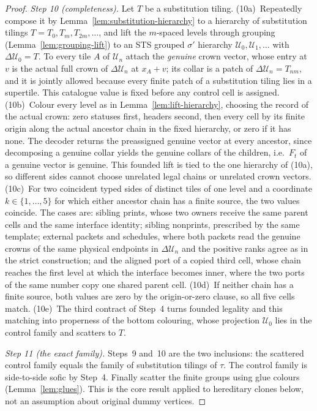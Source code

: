 \documentclass[11pt,a4paper]{article}
\theoremstyle{remark}
\begin{document}
\begin{proof}
\emph{Step 10 (completeness).}  Let $T$ be a substitution tiling.
(10a)~Repeatedly compose it by Lemma~\ref{lem:substitution-hierarchy} to a
hierarchy of substitution tilings $T=T_0,T_m,T_{2m},\ldots$, and lift the
$m$-spaced levels through grouping (Lemma~\ref{lem:grouping-lift}) to an
STS grouped $\sigma'$ hierarchy $\mathcal U_0,\mathcal U_1,\ldots$ with
$\Delta\mathcal U_0=T$.  To every tile $A$ of $\mathcal U_n$ attach the
\emph{genuine} crown vector, whose entry at $v$ is the actual full crown of
$\Delta\mathcal U_n$ at $x_A+v$; its collar is a patch of
$\Delta\mathcal U_n=T_{nm}$, and it is jointly allowed because every finite
patch of a substitution tiling lies in a supertile.  This catalogue value is
fixed before any control cell is assigned.  (10b)~Colour every level as in
Lemma~\ref{lem:lift-hierarchy}, choosing the record of the actual crown:
zero statuses first, headers second, then every cell by its finite origin
along the actual ancestor chain in the fixed hierarchy, or zero if it has
none.  The decoder returns the preassigned genuine vector at every
ancestor, since decomposing a genuine collar yields the genuine collars of
the children, i.e.\ $F_t$ of a genuine vector is genuine.  This founded
lift is tied to the one hierarchy of (10a), so different sides cannot
choose unrelated legal chains or unrelated crown vectors.  (10c)~For two
coincident typed sides of distinct tiles of one level and a coordinate
$k\in\{1,\ldots,5\}$ for which either ancestor chain has a finite source,
the two values coincide.  The cases are: sibling prints, whose two owners
receive the same parent cells and the same interface identity; sibling
nonprints, prescribed by the same template; external packets and schedules,
where both packets read the genuine crowns of the same physical endpoints
in $\Delta\mathcal U_n$ and the positive ranks agree as in the strict
construction; and the aligned port of a copied third cell, whose chain
reaches the first level at which the interface becomes inner, where the
two ports of the same number copy one shared parent cell.  (10d)~If neither
chain has a finite source, both values are zero by the origin-or-zero
clause, so all five cells match.  (10e)~The third contract of Step~4 turns
founded legality and this matching into properness of the bottom
colouring, whose projection $\mathcal U_0$ lies in the control family and
scatters to $T$.

\emph{Step 11 (the exact family).}  Steps~9 and~10 are the two inclusions:
the scattered control family equals the family of substitution tilings of
$\tau$.  The control family is side-to-side sofic by Step~4.  Finally
scatter the finite groups using glue colours (Lemma~\ref{lem:glues}).  This
is the core result applied to hereditary clones below, not an assumption
about original dummy vertices.
\end{proof}
\end{document}
